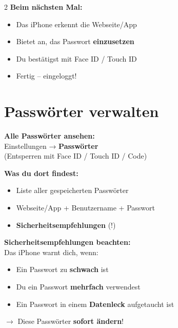 \documentclass[a4paper,landscape,8pt]{extarticle}
\begin{document}
\begin{multicols}{2}
\textbf{Beim nächsten Mal:}
\begin{itemize}
\item Das iPhone erkennt die Webseite/App
\item Bietet an, das Passwort \textbf{einzusetzen}
\item Du bestätigst mit Face ID / Touch ID
\item Fertig -- eingeloggt!
\end{itemize}

\columnbreak

\section*{\textcolor{shieldgray}{Passwörter verwalten}}

\textbf{Alle Passwörter ansehen:}\\
Einstellungen → \textbf{Passwörter}\\
(Entsperren mit Face ID / Touch ID / Code)

\vspace{2mm}

\textbf{Was du dort findest:}
\begin{itemize}
\item Liste aller gespeicherten Passwörter
\item Webseite/App + Benutzername + Passwort
\item \textbf{Sicherheitsempfehlungen} (!)
\end{itemize}

\textbf{Sicherheitsempfehlungen beachten:}\\
Das iPhone warnt dich, wenn:
\begin{itemize}
\item Ein Passwort zu \textbf{schwach} ist
\item Du ein Passwort \textbf{mehrfach} verwendest
\item Ein Passwort in einem \textbf{Datenleck} aufgetaucht ist
\end{itemize}

$\rightarrow$ Diese Passwörter \textbf{sofort ändern}!

\vspace{3mm}

\begin{center}
\end{center}


\end{multicols}
\end{document}

